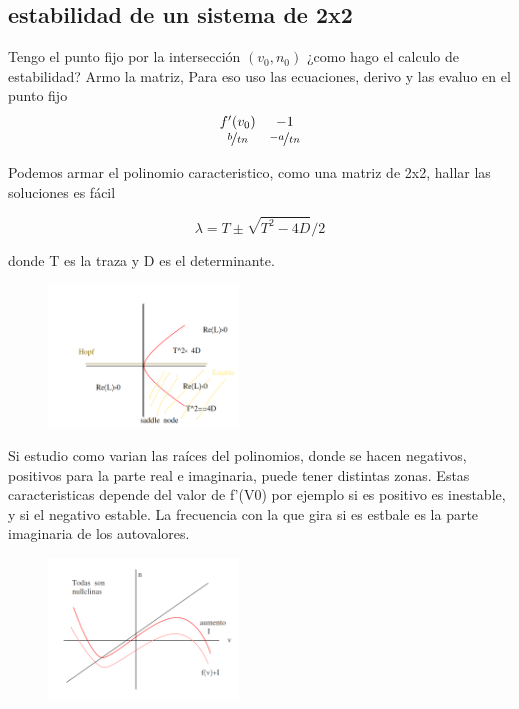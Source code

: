 \subsection{estabilidad de un sistema de 2x2}

Tengo el punto fijo por la intersección $(v_0,n_0)$ ¿como  hago el calculo de estabilidad? Armo la matriz, Para eso uso las ecuaciones, derivo y las evaluo en el punto fijo
\[
\begin{matrix}
	f'(v_0) &  -1   \\
	\nicefrac{b}{tn}& \nicefrac{-a}{tn} \\
\end{matrix}
\]

Podemos armar el polinomio caracteristico, como una matriz de 2x2, hallar las soluciones es fácil

\begin{equation}
	\lambda = T \pm \sqrt{T^2 - 4D}/ 2
\end{equation}

donde T es la traza y D es el determinante.

\begin{figure}[htbp]
	\centering
	\includegraphics[width=0.45\textwidth]{2.png}
\end{figure}



Si estudio como varian las raíces del polinomios, donde se hacen negativos, positivos para la parte real e imaginaria, puede tener distintas zonas. Estas caracteristicas depende del valor de f'(V0) por ejemplo si es positivo es inestable, y si el negativo estable. La frecuencia con la que gira si es estbale es la parte imaginaria de los autovalores.

\begin{figure}[htbp]
	\centering
	\includegraphics[width=0.45\textwidth]{3.png}
\end{figure}



